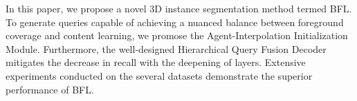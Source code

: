 In this paper, we propose a novel 3D instance segmentation method termed BFL. 
%
To generate queries capable of achieving a nuanced balance between foreground coverage and content learning, we promose the Agent-Interpolation Initialization Module.
Furthermore, the well-designed Hierarchical Query Fusion Decoder mitigates the decrease in recall with the deepening of layers.
Extensive experiments conducted on the several datasets demonstrate the superior performance of BFL.
